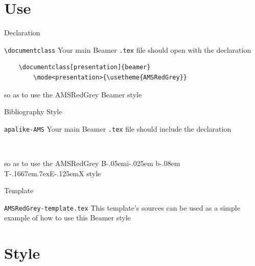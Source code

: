 \documentclass[presentation,cesena,apice]{beamer}\mode<presentation>{\usetheme{AMSRedGrey}}
\def\BibTeX{{\rm B\kern-.05em{\sc i\kern-.025em b}\kern-.08em
    T\kern-.1667em\lower.7ex\hbox{E}\kern-.125emX}}
\begin{document}
\section{Use}

\begin{frame}[c,fragile]{Declaration}
%
\begin{block}{\texttt{\textbackslash{}documentclass}}
Your main Beamer \texttt{.tex} file should open with the declaration
%
\begin{verbatim}
    \documentclass[presentation]{beamer}
        \mode<presentation>{\usetheme{AMSRedGrey}}
\end{verbatim}
%
so as to use the AMSRedGrey Beamer style
\end{block}
%
\end{frame}

\begin{frame}[c,fragile]{Bibliography Style}
%
\begin{block}{\texttt{apalike-AMS}}
Your main Beamer \texttt{.tex} file should include the declaration
\begin{verbatim}
    
\end{verbatim}
so as to use the AMSRedGrey \BibTeX{} style
\end{block}
%
\end{frame}

\begin{frame}[c,fragile]{Template}
%
\begin{block}{\texttt{AMSRedGrey-template.tex}}
This template's sources can be used as a simple example of how to use this Beamer style
\end{block}
%
\end{frame}


\section{Style}
\end{document}
